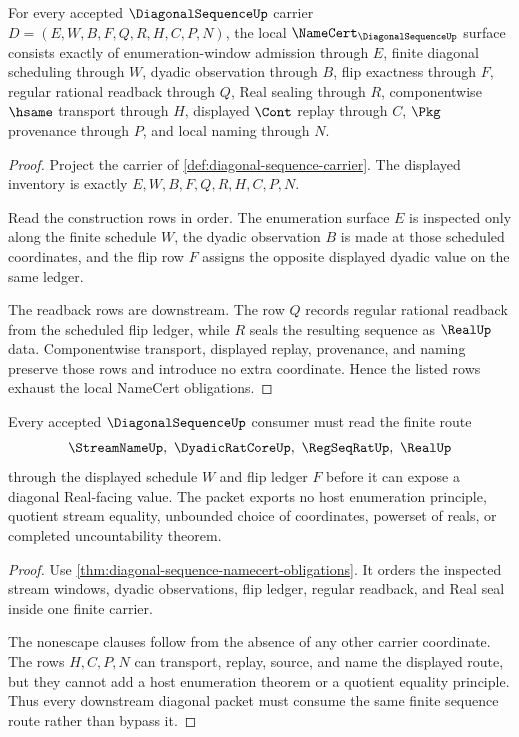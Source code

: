 \begin{theorem}
\label{thm:diagonal-sequence-namecert-obligations}
For every accepted $\DiagonalSequenceUp$ carrier $D=(E,W,B,F,Q,R,H,C,P,N)$, the local $\NameCert_{\DiagonalSequenceUp}$ surface consists exactly of enumeration-window admission through $E$, finite diagonal scheduling through $W$, dyadic observation through $B$, flip exactness through $F$, regular rational readback through $Q$, Real sealing through $R$, componentwise $\hsame$ transport through $H$, displayed $\Cont$ replay through $C$, $\Pkg$ provenance through $P$, and local naming through $N$.
\end{theorem}
\begin{proof}
Project the carrier of \autoref{def:diagonal-sequence-carrier}. The displayed inventory is exactly $E,W,B,F,Q,R,H,C,P,N$.

Read the construction rows in order. The enumeration surface $E$ is inspected only along the finite schedule $W$, the dyadic observation $B$ is made at those scheduled coordinates, and the flip row $F$ assigns the opposite displayed dyadic value on the same ledger.

The readback rows are downstream. The row $Q$ records regular rational readback from the scheduled flip ledger, while $R$ seals the resulting sequence as $\RealUp$ data. Componentwise transport, displayed replay, provenance, and naming preserve those rows and introduce no extra coordinate. Hence the listed rows exhaust the local NameCert obligations.
\end{proof}

\begin{theorem}
\label{thm:diagonal-sequence-nonescape}
Every accepted $\DiagonalSequenceUp$ consumer must read the finite route
$$
\StreamNameUp,\ \DyadicRatCoreUp,\ \RegSeqRatUp,\ \RealUp
$$
through the displayed schedule $W$ and flip ledger $F$ before it can expose a diagonal Real-facing value. The packet exports no host enumeration principle, quotient stream equality, unbounded choice of coordinates, powerset of reals, or completed uncountability theorem.
\end{theorem}
\begin{proof}
Use \autoref{thm:diagonal-sequence-namecert-obligations}. It orders the inspected stream windows, dyadic observations, flip ledger, regular readback, and Real seal inside one finite carrier.

The nonescape clauses follow from the absence of any other carrier coordinate. The rows $H,C,P,N$ can transport, replay, source, and name the displayed route, but they cannot add a host enumeration theorem or a quotient equality principle. Thus every downstream diagonal packet must consume the same finite sequence route rather than bypass it.
\end{proof}

